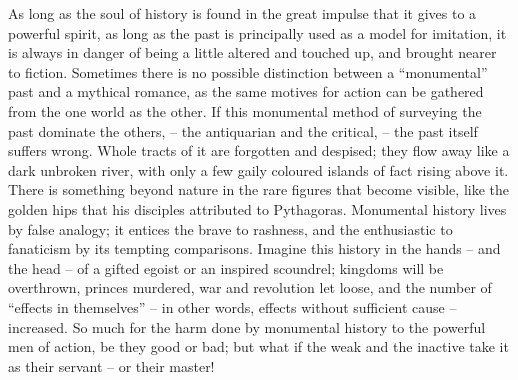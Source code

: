 As long as the soul of history is found in the great impulse that it
gives to a powerful spirit, as long as the past is principally used
as a model for imitation, it is always in danger of being a little
altered and touched up, and brought nearer to fiction. Sometimes
there is no possible distinction between a \enquote{monumental} past and a
mythical romance, as the same motives for action can be gathered from
the one world as the other. If this monumental method of surveying
the past dominate the others, -- the antiquarian and the critical, -- the
past itself suffers wrong. Whole tracts of it are forgotten and
despised; they flow away like a dark unbroken river, with only a few
gaily coloured islands of fact rising above it. There is something
beyond nature in the rare figures that become visible, like the
golden hips that his disciples attributed to Pythagoras. Monumental
history lives by false analogy; it entices the brave to rashness, and
the enthusiastic to fanaticism by its tempting comparisons. Imagine
this history in the hands -- and the head -- of a gifted egoist or an
inspired scoundrel; kingdoms will be overthrown, princes murdered,
war and revolution let loose, and the number of \enquote{effects in
themselves} -- in other words, effects without sufficient
cause -- increased. So much for the harm done by monumental history to
the powerful men of action, be they good or bad; but what if the weak
and the inactive take it as their servant -- or their master!

